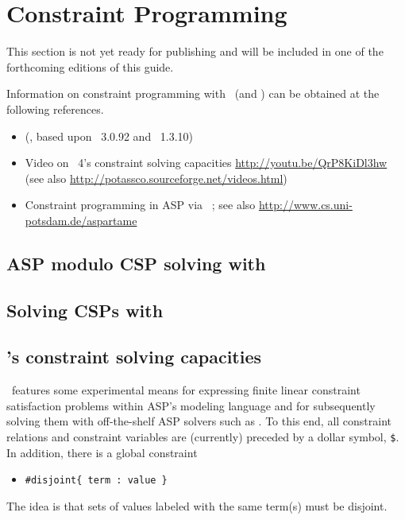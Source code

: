\section{Constraint Programming}\label{sec:constraint}

This section is not yet ready for publishing
and will be included in one of the forthcoming editions of this guide.

Information on constraint programming with \gringo\ (and \clingcon) can be obtained at the following references.

\begin{itemize}
\item \cite{geossc09a,ostsch12a} (\clingcon, based upon \gringo~3.0.92 and \clasp~1.3.10)
\item Video on \gringo~4's constraint solving capacities \url{http://youtu.be/QrP8KiDl3hw} (see also \url{http://potassco.sourceforge.net/videos.html})
\item Constraint programming in ASP via \aspartame\ \cite{bageinscsotawe13a}; see also \url{http://www.cs.uni-potsdam.de/aspartame}
\end{itemize}

\subsection{ASP modulo CSP solving with \clingcon}
\label{sec:clingcon}

\subsection{Solving CSPs with \aspartame}
\label{sec:aspartame}

\subsection{\gringo's constraint solving capacities}

\gringo\ features some experimental means for expressing finite linear constraint satisfaction problems within ASP's modeling language and
for subsequently solving them with off-the-shelf ASP solvers such as \clasp.
%
To this end,
all constraint relations and constraint variables are (currently) preceded by a dollar symbol, \texttt{\$}.
In addition, there is a global constraint
\begin{itemize}
\item[] \texttt{\#disjoint\{ term : value \}}
\end{itemize}
The idea is that sets of values labeled with the same term(s) must be disjoint.

